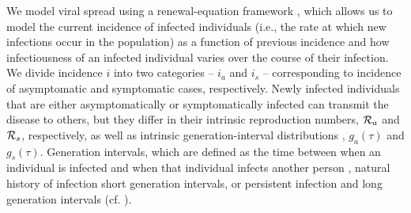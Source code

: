 We model viral spread using a renewal-equation framework \citep{heesterbeek1996concept}, which allows us to model the current incidence of infected individuals (i.e., the rate at which new infections occur in the population) as a function of previous incidence and how infectiousness of an infected individual varies over the course of their infection.
We divide incidence $i$ into two categories -- $i_a$ and $i_s$ -- corresponding to incidence of asymptomatic and symptomatic cases, respectively.
Newly infected individuals that are either asymptomatically or symptomatically infected can transmit the disease to others, but they \DIFaddbegin {}\DIFaddend differ in their intrinsic reproduction numbers, ${\cal{R}}_a$ and ${\cal{R}}_s$, respectively, as well as intrinsic generation-interval distributions \citep{champredon2015intrinsic}, $g_a(\tau)$ and $g_s(\tau)$.
Generation intervals, which are defined as the time between when an individual is infected and when that individual infects another person \citep{svensson2007note}, \DIFdelbegin {}\DIFdelend \DIFaddbegin {}\DIFaddend natural history of infection \DIFdelbegin {}\DIFdelend \DIFaddbegin {}\DIFaddend short generation intervals, or \DIFaddbegin {}\DIFaddend persistent infection and long generation intervals (cf. \citep{roberts2007model}).
\DIFdelbegin {}\DIFdelend 

